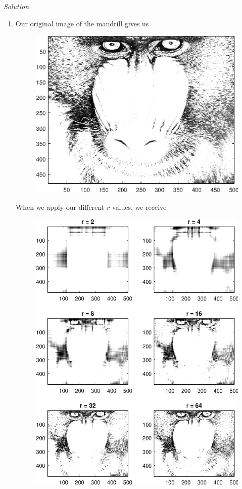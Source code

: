 \documentclass[12pt]{article}
\newcommand{\solution}{\vspace{2 ex} \hspace{-5 ex} \emph{Solution.} }
\begin{document}
\vspace{-2 ex} \solution
\begin{enumerate}[leftmargin=0.6cm,label=(\alph*)]
	\item Our original image of the mandrill gives us
	\begin{figure}[H]
		\begin{center}
			\includegraphics[scale=.6]{hw3p10p1.eps}
		\end{center}
	\end{figure}
	When we apply our different $ r $ values, we receive
	\begin{figure}[H]
		\begin{center}
			\includegraphics[scale=.8]{hw3p10p2.eps}

\end{center}
\end{figure}
\end{enumerate}
\end{document}
